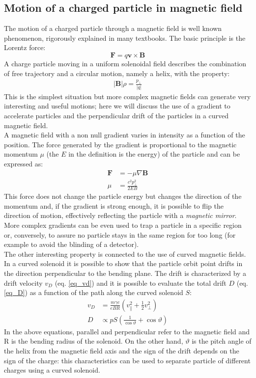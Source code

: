 \documentclass[12pt,a4paper,openright, oneside, titlepage]{book} %
\begin{document}
\subsection{Motion of a charged particle in magnetic field}
\label{magnets}
The motion of a charged particle through a magnetic field is well known phenomenon, 
rigorously explained in many textbooks. The basic principle is the Lorentz force:
$$\textbf{F}=q\textbf{v}\times\textbf{B}$$
A charge particle moving in a uniform solenoidal field describes the combination of free trajectory 
and a circular motion, namely a helix, with the property:
\begin{align}
|\textbf{B}|\rho = \frac{p_\perp}{|q|} 
\label{eq_brho}
\end{align}
This is the simplest situation but more complex magnetic fields can generate very interesting and useful motions; 
here we will discuss the use of a gradient to accelerate particles 
and the perpendicular drift of the particles in a curved magnetic field.\\
A magnetic field with a non null gradient varies in intensity as a function of the position. 
The force generated by the gradient is proportional to the magnetic momentum $\mu$ 
(the $E$ in the definition is the energy) of the particle and can be expressed as:
\begin{align}
\textbf{F} &= -\mu \nabla \textbf{B} \\
\mu &= \frac{c^2 p_\perp^2}{2EB}
\end{align}
This force does not change the particle energy but changes the direction of the momentum and, 
if the gradient is strong enough, it is possible to flip the direction of motion, 
effectively reflecting the particle with a \textit{magnetic mirror}. 
More complex gradients can be even used to trap a particle in a specific region 
or, conversely, to assure no particle stays in the same region for too long 
(for example to avoid the blinding of a detector).\\
The other interesting property is connected to the use of curved magnetic fields. 
In a curved solenoid it is possible to show that 
the particle orbit point drifts in the direction perpendicular to the bending plane. 
The drift is characterized by a drift velocity $v_D$ (eq. \ref{eq_vd}) 
and it is possible to evaluate the total drift $D$ (eq. \ref{eq_D}) 
as a function of the path along the curved solenoid $S$:
\begin{align}
v_D&=\frac{m\gamma c}{eBR}\left(v^2_\parallel+\frac{1}{2}v^2_\perp\right) \label{eq_vd}  \\
D&\propto pS\left(\frac{1}{\cos \vartheta}  + \cos \vartheta \right) \label{eq_D}
\end{align}
In the above equations, parallel and perpendicular refer to the magnetic field and R is the bending radius of the solenoid. 
On the other hand, $\vartheta$ is the pitch angle of the helix from the magnetic field axis 
and the sign of the drift depends on the sign of the charge: 
this characteristics can be used to separate particle of different charges using a curved solenoid.
\end{document}
